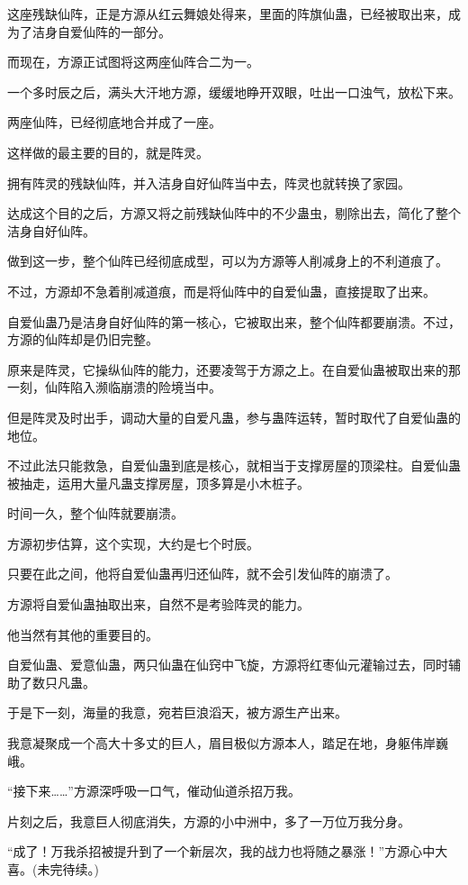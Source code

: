 \begin{this_body}
这座残缺仙阵，正是方源从红云舞娘处得来，里面的阵旗仙蛊，已经被取出来，成为了洁身自爱仙阵的一部分。

而现在，方源正试图将这两座仙阵合二为一。

一个多时辰之后，满头大汗地方源，缓缓地睁开双眼，吐出一口浊气，放松下来。

两座仙阵，已经彻底地合并成了一座。

这样做的最主要的目的，就是阵灵。

拥有阵灵的残缺仙阵，并入洁身自好仙阵当中去，阵灵也就转换了家园。

达成这个目的之后，方源又将之前残缺仙阵中的不少蛊虫，剔除出去，简化了整个洁身自好仙阵。

做到这一步，整个仙阵已经彻底成型，可以为方源等人削减身上的不利道痕了。

不过，方源却不急着削减道痕，而是将仙阵中的自爱仙蛊，直接提取了出来。

自爱仙蛊乃是洁身自好仙阵的第一核心，它被取出来，整个仙阵都要崩溃。不过，方源的仙阵却是仍旧完整。

原来是阵灵，它操纵仙阵的能力，还要凌驾于方源之上。在自爱仙蛊被取出来的那一刻，仙阵陷入濒临崩溃的险境当中。

但是阵灵及时出手，调动大量的自爱凡蛊，参与蛊阵运转，暂时取代了自爱仙蛊的地位。

不过此法只能救急，自爱仙蛊到底是核心，就相当于支撑房屋的顶梁柱。自爱仙蛊被抽走，运用大量凡蛊支撑房屋，顶多算是小木桩子。

时间一久，整个仙阵就要崩溃。

方源初步估算，这个实现，大约是七个时辰。

只要在此之间，他将自爱仙蛊再归还仙阵，就不会引发仙阵的崩溃了。

方源将自爱仙蛊抽取出来，自然不是考验阵灵的能力。

他当然有其他的重要目的。

自爱仙蛊、爱意仙蛊，两只仙蛊在仙窍中飞旋，方源将红枣仙元灌输过去，同时辅助了数只凡蛊。

于是下一刻，海量的我意，宛若巨浪滔天，被方源生产出来。

我意凝聚成一个高大十多丈的巨人，眉目极似方源本人，踏足在地，身躯伟岸巍峨。

“接下来……”方源深呼吸一口气，催动仙道杀招万我。

片刻之后，我意巨人彻底消失，方源的小中洲中，多了一万位万我分身。

“成了！万我杀招被提升到了一个新层次，我的战力也将随之暴涨！”方源心中大喜。(未完待续。)

\end{this_body}

